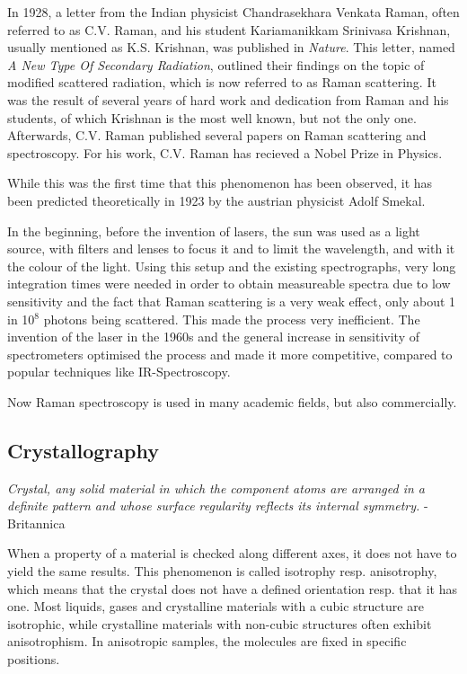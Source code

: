 In 1928, a letter from the Indian physicist Chandrasekhara Venkata Raman, often referred to as C.V. Raman, and his student Kariamanikkam Srinivasa Krishnan, usually mentioned as K.S. Krishnan, was published in \textit{Nature}. This letter, named \textit{A New Type Of Secondary Radiation}, outlined their findings on the topic of modified scattered radiation, which is now referred to as Raman scattering. It was the result of several years of hard work and dedication from Raman and his students, of which Krishnan is the most well known, but not the only one. Afterwards, C.V. Raman published several papers on Raman scattering and spectroscopy. For his work, C.V. Raman has recieved a Nobel Prize in Physics. \cite{ram28}
\bigskip

While this was the first time that this phenomenon has been observed, it has been predicted theoretically in 1923 by the austrian physicist Adolf Smekal.
\bigskip

In the beginning, before the invention of lasers, the sun was used as a light source, with filters and lenses to focus it and to limit the wavelength, and with it the colour of the light. Using this setup and the existing spectrographs, very long integration times were needed in order to obtain measureable  spectra due to low sensitivity and the fact that Raman scattering is a very weak effect, only about 1 in 10\(^8\) photons being scattered. This made the process very inefficient. The invention of the laser in the 1960s and the general increase in sensitivity of spectrometers optimised the process and made it more competitive, compared to popular techniques like IR-Spectroscopy.
\bigskip

Now Raman spectroscopy is used in many academic fields, but also commercially.

\newpage

\subsection{Crystallography}
\textit{Crystal, any solid material in which the component atoms are arranged in a definite pattern and whose surface regularity reflects its internal symmetry.} - Britannica \cite{brittanica}

\bigskip

When a property of a material is checked along different axes, it does not have to yield the same results. This phenomenon is called isotrophy resp. anisotrophy, which means that the crystal does not have a defined orientation resp. that it has one. Most liquids, gases and crystalline materials with a cubic structure are isotrophic, while crystalline materials with non-cubic structures often exhibit anisotrophism. In anisotropic samples, the molecules are fixed in specific positions. 

